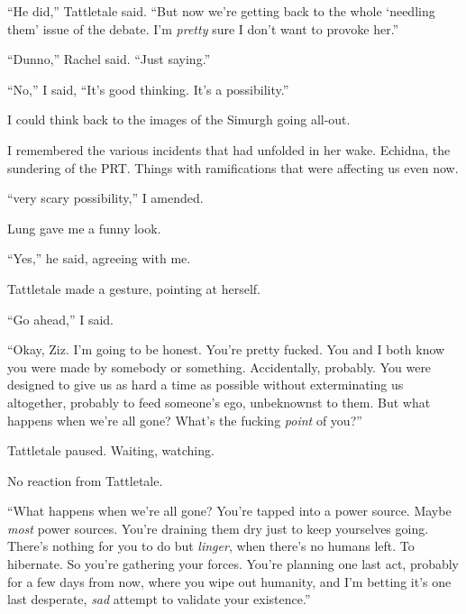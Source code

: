 ``He did,'' Tattletale said.  ``But now we're getting back to the whole `needling them' issue of the debate.  I'm \emph{pretty} sure I don't want to provoke her.''



``Dunno,'' Rachel said.  ``Just saying.''



``No,'' I said, ``It's good thinking.  It's a possibility.''



I could think back to the images of the Simurgh going all-out.



I remembered the various incidents that had unfolded in her wake.  Echidna, the sundering of the PRT.  Things with ramifications that were affecting us even now.



``\ldotsA very scary possibility,'' I amended.



Lung gave me a funny look.



``Yes,'' he said, agreeing with me.



Tattletale made a gesture, pointing at herself.



``Go ahead,'' I said.



``Okay, Ziz.  I'm going to be honest.  You're pretty fucked.  You and I both know you were made by somebody or something.  Accidentally, probably.  You were designed to give us as hard a time as possible without exterminating us altogether, probably to feed someone's ego, unbeknownst to them.  But what happens when we're all gone?  What's the fucking \emph{point }of you?''



Tattletale paused.  Waiting, watching.



No reaction from Tattletale.



``What happens when we're all gone?  You're tapped into a power source.  Maybe \emph{most} power sources.  You're draining them dry just to keep yourselves going.  There's nothing for you to do but \emph{linger}, when there's no humans left.  To hibernate.  So you're gathering your forces.  You're planning one last act, probably for a few days from now, where you wipe out humanity, and I'm betting it's one last desperate, \emph{sad} attempt to validate your existence.''



